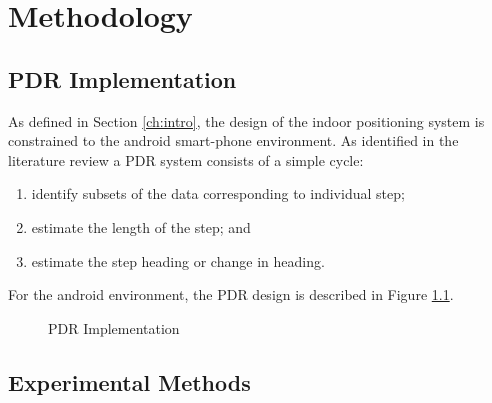 \chapter{Methodology}\label{ch:method}

	\section{PDR Implementation} \label{sec:method_PDR}
    
    	As defined in Section \ref{ch:intro}, the design of the indoor positioning system is constrained to the android smart-phone environment. As identified in the literature review a PDR system consists of a simple cycle:
          \begin{enumerate}
            \item identify subsets of the data corresponding to individual step;
            \item estimate the length of the step; and
            \item estimate the step heading or change in heading.
          \end{enumerate}
          
         For the android environment, the PDR design is described in Figure \ref{fig:method_PDRflow}.
         \begin{figure}[t]
           \centering        
           \caption{PDR Implementation}
           \label{fig:method_PDRflow}
         \end{figure}
    
        
        
        
        
    \section{Experimental Methods} \label{ssec:method_DR_experiment}
    
